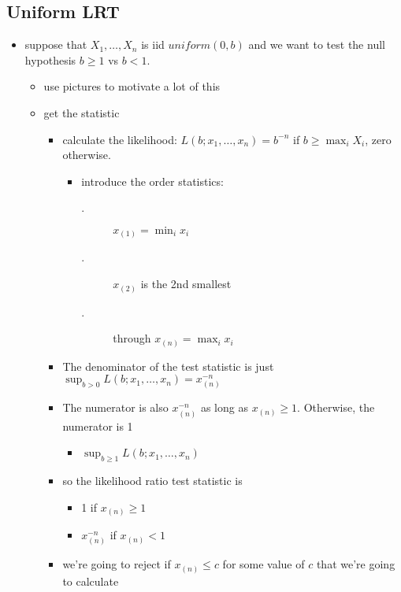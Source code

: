 \subsection{Uniform LRT}

\begin{itemize}
\item suppose that $X_1,\dots,X_n$ is iid $uniform(0,b)$ and we want
      to test the null hypothesis $b \geq 1$ vs $b < 1$.
\begin{itemize}
\item use pictures to motivate a lot of this
\item get the statistic
\begin{itemize}
\item calculate the likelihood: $L(b; x_1,\dots,x_n) = b^{-n}$ if
          $b \geq \max_i X_i$, zero otherwise.
\begin{itemize}
\item introduce the order statistics:
\begin{description}
\item[.] $x_{(1)} = \min_i x_i$
\item[.] $x_{(2)}$ is the 2nd smallest
\item[.] through $x_{(n)} = \max_i x_i$
\end{description}
\end{itemize}
\item The denominator of the test statistic is just $\sup_{b >
          0} L(b; x_1,\dots,x_n) = x_{(n)}^{-n}$
\item The numerator is also $x_{(n)}^{-n}$ as long as $x_{(n)}
          \geq 1$.  Otherwise, the numerator is 1
\begin{itemize}
\item $\sup_{b \geq 1} L(b; x_1,\dots,x_n)$
\end{itemize}
\item so the likelihood ratio test statistic is
\begin{itemize}
\item 1 if $x_{(n)} \geq 1$
\item $x_{(n)}^{-n}$ if $x_{(n)} < 1$
\end{itemize}
\item we're going to reject if $x_{(n)} \leq c$ for some value of
          $c$ that we're going to calculate
\end{itemize}
\end{itemize}
\end{itemize}
